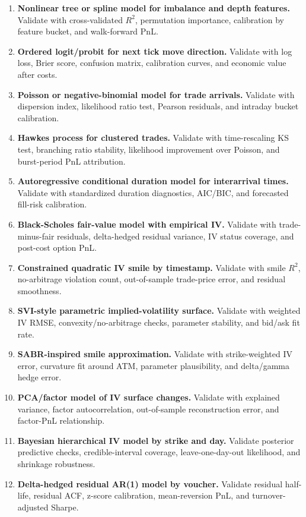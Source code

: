 \documentclass[11pt]{article}
\begin{document}
\begin{enumerate}[label=M\arabic*.,leftmargin=*]
  \item \textbf{Nonlinear tree or spline model for imbalance and depth features.} Validate with cross-validated \(R^2\), permutation importance, calibration by feature bucket, and walk-forward PnL.
  \item \textbf{Ordered logit/probit for next tick move direction.} Validate with log loss, Brier score, confusion matrix, calibration curves, and economic value after costs.
  \item \textbf{Poisson or negative-binomial model for trade arrivals.} Validate with dispersion index, likelihood ratio test, Pearson residuals, and intraday bucket calibration.
  \item \textbf{Hawkes process for clustered trades.} Validate with time-rescaling KS test, branching ratio stability, likelihood improvement over Poisson, and burst-period PnL attribution.
  \item \textbf{Autoregressive conditional duration model for interarrival times.} Validate with standardized duration diagnostics, AIC/BIC, and forecasted fill-risk calibration.
  \item \textbf{Black-Scholes fair-value model with empirical IV.} Validate with trade-minus-fair residuals, delta-hedged residual variance, IV status coverage, and post-cost option PnL.
  \item \textbf{Constrained quadratic IV smile by timestamp.} Validate with smile \(R^2\), no-arbitrage violation count, out-of-sample trade-price error, and residual smoothness.
  \item \textbf{SVI-style parametric implied-volatility surface.} Validate with weighted IV RMSE, convexity/no-arbitrage checks, parameter stability, and bid/ask fit rate.
  \item \textbf{SABR-inspired smile approximation.} Validate with strike-weighted IV error, curvature fit around ATM, parameter plausibility, and delta/gamma hedge error.
  \item \textbf{PCA/factor model of IV surface changes.} Validate with explained variance, factor autocorrelation, out-of-sample reconstruction error, and factor-PnL relationship.
  \item \textbf{Bayesian hierarchical IV model by strike and day.} Validate posterior predictive checks, credible-interval coverage, leave-one-day-out likelihood, and shrinkage robustness.
  \item \textbf{Delta-hedged residual AR(1) model by voucher.} Validate residual half-life, residual ACF, z-score calibration, mean-reversion PnL, and turnover-adjusted Sharpe.

\end{enumerate}
\end{document}
